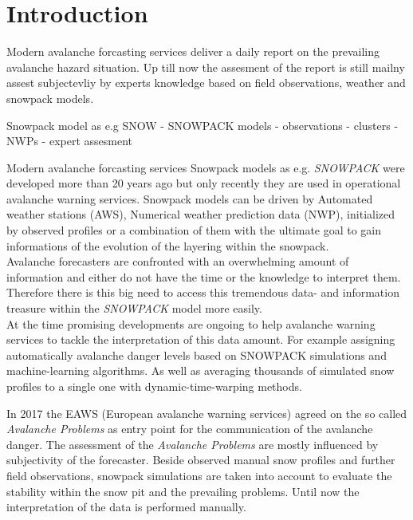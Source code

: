 \chapter{Introduction}
\label{sec:intro} 

Modern avalanche forcasting services deliver a daily report on the prevailing avalanche hazard situation. 
Up till now the assesment of the report is still mailny assest subjectevliy by experts knowledge based on 
field observations, weather and snowpack models.

Snowpack model as e.g SNOW
- SNOWPACK models 
- observations
- clusters
- NWPs
- expert assesment

Modern avalanche forcasting services 
\noindent Snowpack models as e.g. \textit{SNOWPACK} were developed more than 20 years ago but only recently they 
are used in operational avalanche warning services. Snowpack models can be driven by Automated weather stations (AWS), 
Numerical weather prediction data (NWP), initialized by observed profiles or a combination of them with the ultimate 
goal to gain informations of the evolution of the layering within the snowpack.\autocite{lehningSnowpackModelCalculations1999} \\
Avalanche forecasters are confronted with an overwhelming amount of information and either do not have the time or 
the knowledge to interpret them. Therefore there is this big need to access this tremendous data- and information 
treasure within the \textit{SNOWPACK} model more easily.
\\
\noindent At the time promising developments are ongoing to help avalanche warning services to tackle the 
interpretation of this data amount. For example \autocite{perez-guillenDatadrivenAutomatedPredictions2022}  
assigning automatically avalanche danger levels based on SNOWPACK simulations and machine-learning algorithms. 
As well as \autocite{herlaDataExplorationTool2022} averaging thousands of simulated snow profiles to a single 
one with dynamic-time-warping methods.

\noindent In 2017 the EAWS (European avalanche warning services) agreed on the so called \textit{Avalanche Problems} 
as entry point for the communication of the avalanche danger.\autocite{eawsTypicalAvalancheProblems2017} 
The assessment of the \textit{Avalanche Problems} are mostly influenced by subjectivity of the forecaster. 
Beside observed manual snow profiles and further field observations, snowpack simulations are taken into account 
to evaluate the stability within the snow pit and the prevailing problems. Until now the interpretation of the data 
is performed manually.

